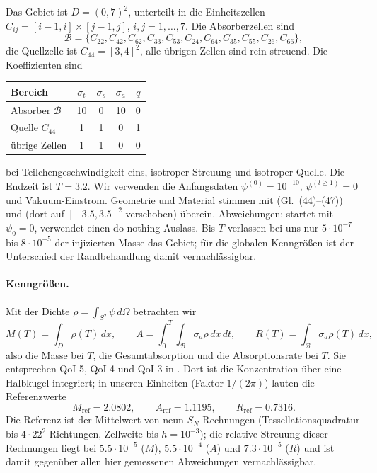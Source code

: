 Das Gebiet ist $D=(0,7)^2$, unterteilt in die Einheitszellen
$C_{ij}=[i-1,i]\times[j-1,j]$, $i,j=1,\dots,7$. Die Absorberzellen sind
\[
  \mathcal B=\{C_{22},C_{42},C_{62},C_{33},C_{53},C_{24},C_{64},C_{35},C_{55},C_{26},C_{66}\},
\]
die Quellzelle ist $C_{44}=[3,4]^2$, alle übrigen Zellen sind rein streuend. Die Koeffizienten sind
\begin{center}
\begin{tabular}{lcccc}
  \toprule
  Bereich & $\sigma_t$ & $\sigma_s$ & $\sigma_a$ & $q$ \\
  \midrule
  Absorber $\mathcal B$ & 10 & 0 & 10 & 0 \\
  Quelle $C_{44}$       & 1  & 1 & 0  & 1 \\
  übrige Zellen         & 1  & 1 & 0  & 0 \\
  \bottomrule
\end{tabular}
\end{center}
bei Teilchengeschwindigkeit eins, isotroper Streuung und isotroper Quelle. Die Endzeit ist $T=3.2$.
Wir verwenden die Anfangsdaten $\psi^{(0)}=10^{-10}$, $\psi^{(l\ge1)}=0$ und Vakuum-Einstrom.
Geometrie und Material stimmen mit \cite{moujaes_2025} (Gl.~(44)--(47)) und
\cite{schotthoefer_hauck_2025} (dort auf $[-3.5,3.5]^2$ verschoben) überein. Abweichungen:
\cite{schotthoefer_hauck_2025} startet mit $\psi_0=0$, \cite{moujaes_2025} verwendet einen
do-nothing-Auslass. Bis $T$ verlassen bei uns nur $5\cdot10^{-7}$ bis $8\cdot10^{-5}$ der
injizierten Masse das Gebiet; für die globalen Kenngrößen ist der Unterschied der Randbehandlung
damit vernachlässigbar.

\paragraph{Kenngrößen.} Mit der Dichte $\rho=\int_{S^2}\psi\,d\Omega$ betrachten wir
\[
  M(T)=\int_D\rho(T)\,dx,\qquad
  A=\int_0^T\!\!\int_{\mathcal B}\sigma_a\rho\,dx\,dt,\qquad
  R(T)=\int_{\mathcal B}\sigma_a\rho(T)\,dx,
\]
also die Masse bei $T$, die Gesamtabsorption und die Absorptionsrate bei $T$. Sie entsprechen
QoI-5, QoI-4 und QoI-3 in \cite[Tab.~1]{schotthoefer_hauck_2025}. Dort ist die Konzentration über
eine Halbkugel integriert; in unseren Einheiten (Faktor $1/(2\pi)$) lauten die Referenzwerte
\[
  M_{\mathrm{ref}}=2.0802,\qquad A_{\mathrm{ref}}=1.1195,\qquad R_{\mathrm{ref}}=0.7316 .
\]
Die Referenz ist der Mittelwert von neun $S_N$-Rechnungen (Tessellationsquadratur bis $4\cdot22^2$
Richtungen, Zellweite bis $h=10^{-3}$); die relative Streuung dieser Rechnungen liegt bei
$5.5\cdot10^{-5}$ ($M$), $5.5\cdot10^{-4}$ ($A$) und $7.3\cdot10^{-5}$ ($R$) und ist damit
gegenüber allen hier gemessenen Abweichungen vernachlässigbar.

